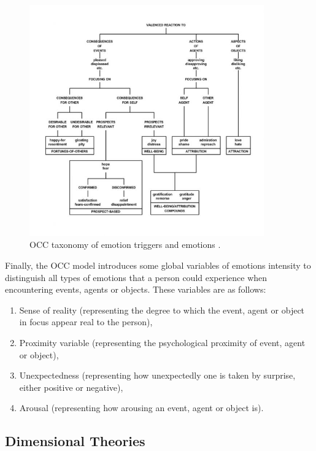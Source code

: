 \documentclass[11pt]{article}
\begin{document}
\begin{figure}[tbh]
  \center
  \includegraphics[width=0.9\textwidth]{figure/occ-structure.jpg}
  \caption{OCC taxonomy of emotion triggers and emotions \cite{occ:structure}.}
  \label{fig:occ-structure}
\end{figure}

Finally, the OCC model introduces some global variables of emotions intensity to
distinguish all types of emotions that a person could experience when
encountering events, agents or objects. These variables are as follows:

\begin{enumerate}
	\item Sense of reality (representing the degree to which the event, agent or
	object in focus appear real to the person),

	\item Proximity variable (representing the psychological proximity of event,
	agent or object),

	\item Unexpectedness (representing how unexpectedly one is taken by surprise,
	either positive or negative),

	\item Arousal (representing how arousing an event, agent or object is).
\end{enumerate}

\subsection{Dimensional Theories}
\end{document}
